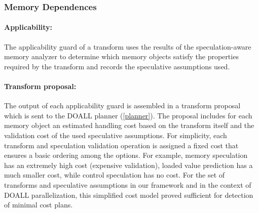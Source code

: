 
\subsubsection{Memory Dependences}


\paragraph{Applicability:}
%
The applicability guard of a transform uses the results of the
speculation-aware memory analyzer to determine which memory objects
satisfy the properties required by the transform and records the
speculative assumptions used.
%

\paragraph{Transform proposal:} The output of each applicability
guard is assembled in a transform proposal which is sent to the
DOALL planner (\cref{planner}).
%
The proposal includes for each memory object an estimated handling
cost based on the transform itself and the validation cost of the
used speculative assumptions.
%
%
For simplicity, each transform and speculation
validation operation is assigned a fixed
cost that ensures a basic ordering among the options. For
example,
memory speculation has an extremely high cost (expensive validation),
loaded value prediction has a much smaller cost, while
control speculation has no cost.
%
%
For the set of transforms and speculative assumptions in our
framework and in the context of DOALL parallelization, this simplified
cost model proved sufficient for detection of minimal cost plans.

